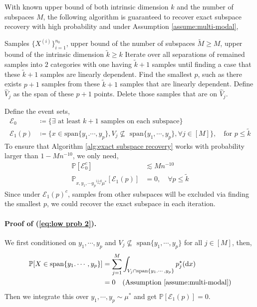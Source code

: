 \documentclass{article}
\newcommand{\defn}{\coloneqq}
\newcommand{\diff}{\,\mathrm{d}}
\theoremstyle{plain}
\theoremstyle{remark}
\begin{document}
With known upper bound of both intrinsic dimension $k$ and the number of subspaces $M$, the following algorithm is guaranteed to recover exact subspace recovery with high probability and under Assumption \ref{assume:multi-modal}, 
\begin{algorithm}[h]
\caption{Exact subspace recovery}
\label{alg:exact subspace recovery}
\begin{algorithmic}[1]
\REQUIRE Samples $\{X^{(i)}\}_{i=1}^{n_0}$, upper bound of the number of subspaces $\widetilde{M}\geq M$, upper bound of the intrinsic dimension $\widetilde{k}\geq k$
    \STATE Iterate over all separations of remained samples into $2$ categories with one having $\widetilde{k}+1$ samples until finding a case that these $\widetilde{k}+1$ samples are linearly dependent.
    \STATE Find the smallest $p$, such as there exists $p+1$ samples from these $\widetilde{k}+1$ samples that are linearly dependent.
    \STATE Define $\widehat{V}_j $ as the span of these $p+1$ points. 
    \STATE Delete those samples that are on $\widehat{V}_j$.
\ENDFOR
\end{algorithmic}    
\end{algorithm}

Define the event sets, 
\begin{align*}
    \mathcal{E}_0 &\defn \Big\{ \exists \text{ at least } k+1 \text{ samples on each subspace}\Big\} \\
    \mathcal{E}_1(p) & \defn \Big\{ x \in \text{span} \{ y_1.\cdots,y_p\}, V_{j} \nsubseteq\text{ span} \{ y_1,\cdots,y_p\}, \forall j\in [M] \Big\}, \quad \text{for }p\leq \widetilde{k}
\end{align*}
To ensure that Algorithm \ref{alg:exact subspace recovery} works with probability larger than $1-Mn^{-10}$, we only need, 
\begin{subequations}
    \begin{align}
    \mathbb{P}[\mathcal{E}_0^c] &\lesssim Mn^{-10}\label{eq:low prob 1} \\
    \mathbb{P}_{x,y_1,\cdots y_p \overset{\text{i.i.d}}{\sim} \mu^*}[\mathcal{E}_1(p)] &= 0, \quad \forall p\leq \widetilde{k} \label{eq:low prob 2}
    \end{align}
\end{subequations}
Since under $\mathcal{E}_1(p)^c$, samples from other subspaces will be excluded via finding the smallest $p$, we could recover the exact subspace in each iteration.

\paragraph*{Proof of (\ref{eq:low prob 2}).}
We first conditioned on $y_1,\cdots,y_p$ and $V_j \nsubseteq\text{ span} \{ y_1,\cdots,y_p\}$ for all $j\in [M]$, then, 
\begin{align*}
    \mathbb{P} [X\in \text{span} \{ y_1.\cdots,y_p\}] &= \sum_{j=1}^M \int_{V_j \cap \text{span} \{ y_1.\cdots,y_p\} }  p_j^\star(\!\diff x) \\
    &= 0 \quad (\text{Assumption \ref{assume:multi-modal}})
\end{align*}
Then we integrate this over $y_1,\cdots,y_p \sim \mu^*$ and get $\mathbb{P}[\mathcal{E}_1(p)] = 0$.
\end{document}
